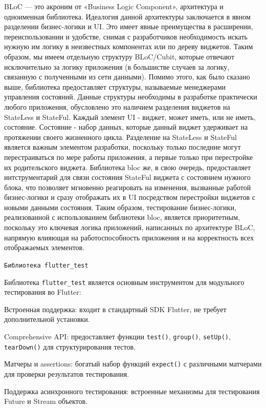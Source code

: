 \documentclass[14pt, russian]{scrartcl}
\begin{document}
BLoC — это акроним от «Business Logic Component», архитектура и одноименная библиотека. Идеалогия данной архитектуры заключается в явном разделении бизнес-логики и UI. Это имеет явные преимущества в расширении, переиспользовании и удобстве, снимая с 
разработчиков необходимость искать нужную им логику в неизвестных компонентах или по дереву виджетов. Таким образом, мы имеем отдельную структуру BLoC/Cubit, которые отвечают исключительно за логику приложения (в большистве случаев за логику, связанную с полученными из сети данными). 
Помимо этого, как было сказано выше, библиотека предоставляет структуры, называемые менеджерами управления состояний. Данные структуры необходимы в разработке практически любого приложения, обусловлено это наличием разделения виджетов на StateLess и  StateFul. Каждый элемент UI - 
виджет, может иметь, или не иметь, состояние. Состояние - набор данных, которые данный виджет удерживает на протяжении своего жизненного цикла. Разделение на StateLess и StateFul является важным элементом разработки, поскольку только последние могут перестраиваться по мере 
работы приложения, а первые только при перестройке их родительского виджета. Библиотека bloc же, в свою очередь, предоставляет интструментарий для связи состояния StateFul виджета с состоянием нужного блока, что позволяет мгновенно реагировать на изменения, вызванные работой 
бизнес-логики и сразу отображать их в UI посредством перестройки виджетов с новыми данными состояния. Таким образом, тестирование бизнес-логики, реализованной с использованием библиотеки bloc, является приоритетным, поскольку это ключевая логика приложений, написанных 
по архитектуре BLoC, напрямую влияющая на работоспособность приложения и на корректность всех отображаемых элементов.

\texttt{Библиотека flutter\_test}

Библиотека \texttt{flutter\_test} является основным инструментом для модульного тестирования во Flutter:
\begin{itemize*}
    \item Встроенная поддержка: входит в стандартный SDK Flutter, не требует дополнительной установки.
    \item Comprehensive API: предоставляет функции \texttt{test()}, \texttt{group()}, \texttt{setUp()}, \texttt{tearDown()} для структурирования тестов.
    \item Матчеры и assertions: богатый набор функций \texttt{expect()} с различными матчерами для проверки результатов тестирования.
    \item Поддержка асинхронного тестирования: встроенные механизмы для тестирования Future и Stream объектов.
\end{itemize*}
\end{document}
